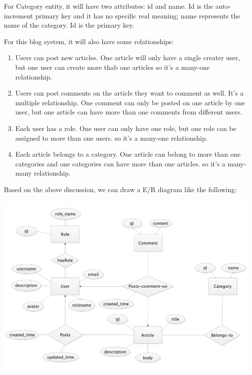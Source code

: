 \documentclass[11pt]{homework}
\begin{document}
For Category entity, it will have two attributes: id and name. Id is the auto-increment primary key and it has no
specific real meaning; name represents the name of the category. Id is the primary key.

For this blog system, it will also have some relationships:

\begin{enumerate}

\item Users can post new articles. One article will only have a single creater user, but one user can create more thab one 
articles so it's a many-one relationship. 

\item Users can post comments on the article they want to comment as well. It's a multiple relationship. One 
comment can only be posted on one article by one user, but one article can have more than one comments from 
different users. 

\item Each user has a role. One user can only have one role, but one role can be assigned to more than one users.
so it's a many-one relationship. 

\item Each article belongs to a category. One article can belong to more than one categories and one categories 
can have more than one articles. so it's a many-many relationship. 

\end{enumerate}

Based on the above discussion, we can draw a E/R diagram like the following:

\begin{center}
  \includegraphics[scale=0.445]{images/ER_Diagram}
\end{center}
\end{document}
